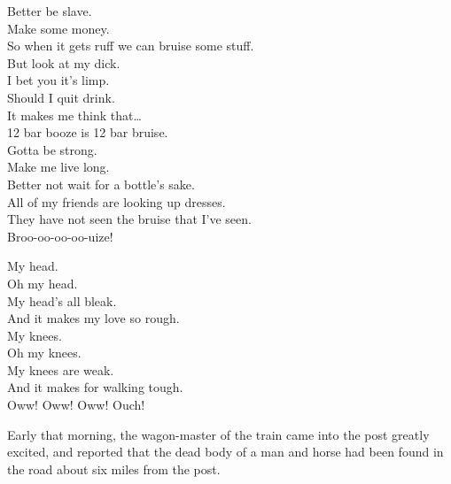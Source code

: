 


Better be slave. \\
Make some money. \\
So when it gets ruff we can bruise some stuff. \\

But look at my dick. \\
I bet you it's limp. \\
Should I quit drink. \\
It makes me think that… \\

12 bar booze is 12 bar bruise. \\

Gotta be strong. \\
Make me live long. \\
Better not wait for a bottle's sake. \\

All of my friends are looking up dresses. \\
They have not seen the bruise that I've seen. \\
Broo-oo-oo-oo-uize! \\




My head. \\
Oh my head. \\
My head's all bleak. \\
And it makes my love so rough. \\

My knees. \\
Oh my knees. \\
My knees are weak. \\
And it makes for walking tough. \\

Oww! Oww! Oww! Ouch! \\




Early that morning, the wagon-master of the train came into the post greatly excited, and reported that the dead body of a man and horse had been found in the road about six miles from the post. \\

